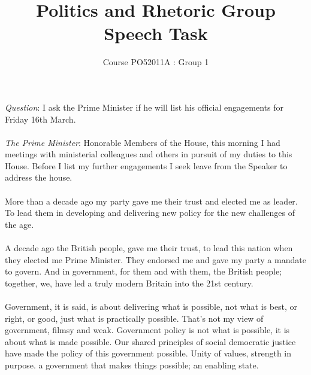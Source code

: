 \documentclass[14pt]{article}
\title{Politics and Rhetoric Group Speech Task}
\author{Course PO52011A : Group 1}
\begin{document}
\maketitle
\date{}

\begin{onehalfspace}

\paragraph{}\emph{Question}: I ask the Prime Minister if he will list his official engagements for Friday 16th March.

\paragraph{}\emph{The Prime Minister}: Honorable Members of the House, this morning I had meetings with ministerial colleagues and others in pursuit of my duties to this House. Before I list my further engagements I seek leave from the Speaker to address the house.

\paragraph{}More than a decade ago my party gave me their trust and elected me as leader. To lead them in developing and delivering new policy for the new challenges of the age.

\paragraph{}A decade ago the British people, gave me their trust, to lead this nation when they elected me Prime Minister. They endorsed me and gave my party a mandate to govern. And in government, for them and with them, the British people; together, we, have led a truly modern Britain into the 21st century.

\paragraph{}Government, it is said, is about delivering what is possible, not what is best, or right, or good, just what is practically possible. That's not my view of government, filmsy and weak. Government policy is not what is possible, it is about what is made possible. Our shared principles of social democratic justice have made the policy of this government possible. Unity of values, strength in purpose. a government that makes things possible; an enabling state.


\end{onehalfspace}
\end{document}

